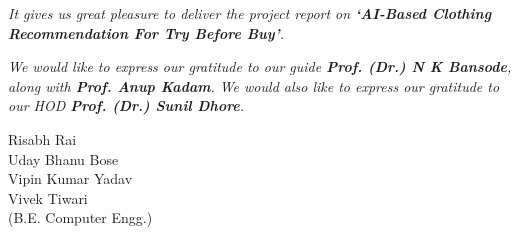 
\textit{It gives us great pleasure to deliver the project report on \textbf{`AI-Based Clothing Recommendation For Try Before Buy'}.}

\textit{We would like to express our gratitude to our guide \textbf{Prof. (Dr.) N K Bansode}, along with \textbf{Prof. Anup Kadam}. We would also like to express our gratitude to our HOD \textbf{Prof. (Dr.) Sunil Dhore}.}

\vspace*{\baselineskip}

\begin{flushright}
	Risabh Rai \\
	Uday Bhanu Bose \\
	Vipin Kumar Yadav \\
	Vivek Tiwari \\
	\vspace*{0.5 \baselineskip}
	(B.E. Computer Engg.)
\end{flushright}